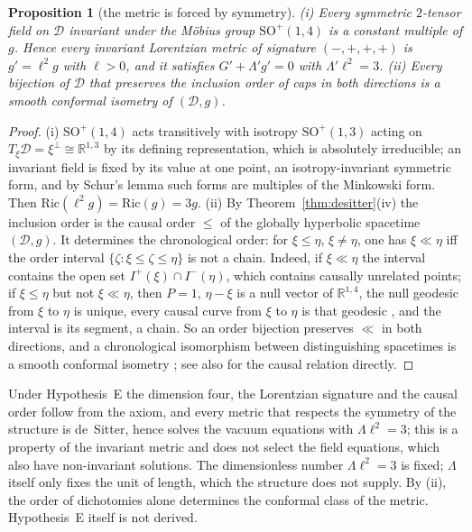 \documentclass[aps,pra,onecolumn,superscriptaddress,nofootinbib,10pt]{revtex4-2}
\newtheorem{proposition}[theorem]{Proposition}
\theoremstyle{definition}
\theoremstyle{remark}
\newcommand{\R}{\mathbb{R}}
\newcommand{\cD}{\mathcal{D}}
\newcommand{\SO}{\mathrm{SO}}
\begin{document}
\begin{proposition}[the metric is forced by symmetry]\label{prop:invmetric}
(i) Every symmetric $2$-tensor field on $\cD$ invariant under the M\"obius group $\SO^+(1,4)$ is a constant
multiple of $g$.  Hence every invariant Lorentzian metric of signature $(-,+,+,+)$ is $g'=\ell^2g$ with $\ell>0$, and it satisfies
$G'+\Lambda'g'=0$ with $\Lambda'\ell^2=3$.
(ii) Every bijection of $\cD$ that preserves the inclusion order of caps in both directions is a smooth
conformal isometry of $(\cD,g)$.
\end{proposition}
\begin{proof}
(i) $\SO^+(1,4)$ acts transitively with isotropy $\SO^+(1,3)$ acting on $T_\xi\cD=\xi^\perp\cong\R^{1,3}$ by its
defining representation, which is absolutely irreducible; an invariant field is fixed by its value at
one point, an isotropy-invariant symmetric form, and by Schur's lemma such forms are multiples of the
Minkowski form.  Then $\mathrm{Ric}(\ell^2g)=\mathrm{Ric}(g)=3g$.  (ii) By Theorem~\ref{thm:desitter}(iv) the
inclusion order is the causal order $\le$ of the globally hyperbolic spacetime $(\cD,g)$.  It determines the
chronological order: for $\xi\le\eta$, $\xi\ne\eta$, one has $\xi\ll\eta$ iff the order interval
$\{\zeta:\xi\le\zeta\le\eta\}$ is not a chain.  Indeed, if $\xi\ll\eta$ the interval contains the open set
$I^+(\xi)\cap I^-(\eta)$, which contains causally unrelated points; if $\xi\le\eta$ but not $\xi\ll\eta$, then $P=1$,
$\eta-\xi$ is a null vector of $\R^{1,4}$, the null geodesic from $\xi$ to $\eta$ is unique, every causal curve
from $\xi$ to $\eta$ is that geodesic \cite{ONeill}, and the interval is its segment, a chain.  So an order
bijection preserves $\ll$ in both directions, and a chronological isomorphism between distinguishing
spacetimes is a smooth conformal isometry \cite{HKM76,Malament77}; see also \cite{Levichev87} for the causal
relation directly.
\end{proof}
Under Hypothesis~E the dimension four, the Lorentzian signature and the causal order follow from the
axiom, and every metric that respects the symmetry of the structure is de~Sitter, hence solves the
vacuum equations with $\Lambda\ell^2=3$; this is a property of the invariant metric and does not select the
field equations, which also have non-invariant solutions.  The dimensionless number $\Lambda\ell^2=3$ is fixed; $\Lambda$ itself only fixes the
unit of length, which the structure does not supply.  By (ii), the order of dichotomies alone determines the
conformal class of the metric.  Hypothesis~E itself is not derived.
\end{document}
